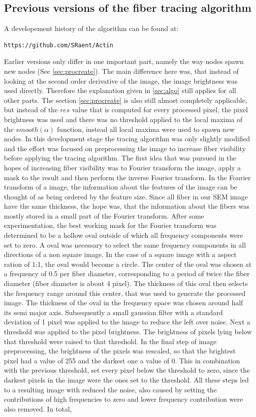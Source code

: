 \documentclass[12pt,english,twocolumn]{revtex4}
\begin{document}
\subsection{Previous versions of the fiber tracing algorithm}
A developement history of the algorithm can be found at: \begin{verbatim}https://github.com/SRaent/Actin \end{verbatim}
Earlier versions only differ in one important part, namely the way nodes spawn new nodes (See \ref{sec:procreate}). The main difference here was, that instead of looking at the second order derivative of the image, the image brightness was used directly. Therefore the explanation given in \ref{sec:algo} still applies for all other parts. The section \ref{sec:procreate} is also still almost completely applicable, but instead of the $res$ value that is computed for every processed pixel, the pixel brightness was used and there was no threshold applied to the local maxima of the $smooth(\alpha)$ function, instead all local maxima were used to spawn new nodes. In this development stage the tracing algorithm was only slightly modified and the effort was focused on preprocessing the image to increase fiber visibility before applying the tracing algorithm. The first idea that was pursued in the hopes of increasing fiber visibility was to Fourier transform the image, apply a mask to the result and then perform the inverse Fourier transform. In the Fourier transform of a image, the information about the features of the image can be thought of as being ordered by the feature size. Since all fiber in our SEM image have the same thickness, the hope was, that the information about the fibers was mostly stored in a small part of the Fourier transform. After some experimentation, the best working mask for the Fourier transform was determined to be a hollow oval outside of which all frequency components were set to zero. A oval was necessary to select the same frequency components in all directions of a non square image. In the case of a square image with a aspect ration of 1:1, the oval would become a circle. The center of the oval was chosen at a frequency of 0.5 per fiber diameter, corresponding to a period of twice the fiber diameter (fiber diameter is about 4 pixel). The thickness of this oval then selects the frequency range around this center, that was used to generate the processed image. The thickness of the oval in the frequency space was chosen around half its semi major axis. Subsequently a small gaussian filter with a standard deviation of 1 pixel was applied to the image to reduce the left over noise. Next a threshold was applied to the pixel brightness. The brightness of pixels lying below that threshold were raised to that threshold. In the final step of image preprocessing, the brightness of the pixels was rescaled, so that the brightest pixel had a value of 255 and the darkest one a value of 0. This in combination with the previous threshold, set every pixel below the threshold to zero, since the darkest pixels in the image were the ones set to the threshold. All these steps led to a resulting image with reduced the noise, also caused by setting the contributions of high frequencies to zero and lower frequency contribution were also removed. In total, 
\end{document}
